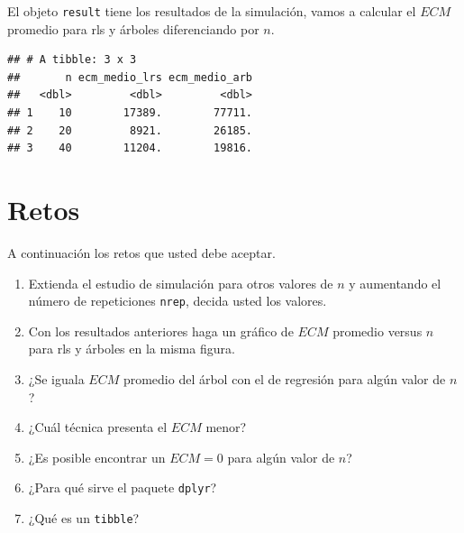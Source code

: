 \documentclass[]{book}
\makeatletter
\newenvironment{Shaded}{\begin{snugshade}}{\end{snugshade}}
\newcommand{\DataTypeTok}[1]{\textcolor[rgb]{0.13,0.29,0.53}{#1}}
\newcommand{\KeywordTok}[1]{\textcolor[rgb]{0.13,0.29,0.53}{\textbf{#1}}}
\newcommand{\NormalTok}[1]{#1}
\newcommand{\OperatorTok}[1]{\textcolor[rgb]{0.81,0.36,0.00}{\textbf{#1}}}
\newcommand{\StringTok}[1]{\textcolor[rgb]{0.31,0.60,0.02}{#1}}
\providecommand{\tightlist}{%
  \setlength{\itemsep}{0pt}\setlength{\parskip}{0pt}}
\newenvironment{kframe}{%
\medskip{}
\setlength{\fboxsep}{.8em}
 \def\at@end@of@kframe{}%
 \ifinner\ifhmode%
  \def\at@end@of@kframe{\end{minipage}}%
  \begin{minipage}{\columnwidth}%
 \fi\fi%
 \def\FrameCommand##1{\hskip\@totalleftmargin \hskip-\fboxsep
 \colorbox{shadecolor}{##1}\hskip-\fboxsep
     \hskip-\linewidth \hskip-\@totalleftmargin \hskip\columnwidth}%
 \MakeFramed {\advance\hsize-\width
   \@totalleftmargin\z@ \linewidth\hsize
   \@setminipage}}%
 {\par\unskip\endMakeFramed%
 \at@end@of@kframe}
\renewenvironment{Shaded}{\begin{kframe}}{\end{kframe}}
\makeatother
\begin{document}
El objeto \texttt{result} tiene los resultados de la simulación, vamos a calcular el \(ECM\) promedio para rls y árboles diferenciando por \(n\).

\begin{Shaded}
\end{Shaded}

\begin{verbatim}
## # A tibble: 3 x 3
##       n ecm_medio_lrs ecm_medio_arb
##   <dbl>         <dbl>         <dbl>
## 1    10        17389.        77711.
## 2    20         8921.        26185.
## 3    40        11204.        19816.
\end{verbatim}

\hypertarget{retos}{%
\section*{Retos}\label{retos}}

A continuación los retos que usted debe aceptar.

\begin{enumerate}
\def\labelenumi{\arabic{enumi}.}
\tightlist
\item
  Extienda el estudio de simulación para otros valores de \(n\) y aumentando el número de repeticiones \texttt{nrep}, decida usted los valores.
\item
  Con los resultados anteriores haga un gráfico de \(ECM\) promedio versus \(n\) para rls y árboles en la misma figura.
\item
  ¿Se iguala \(ECM\) promedio del árbol con el de regresión para algún valor de \(n\)?
\item
  ¿Cuál técnica presenta el \(ECM\) menor?
\item
  ¿Es posible encontrar un \(ECM=0\) para algún valor de \(n\)?
\item
  ¿Para qué sirve el paquete \texttt{dplyr}?
\item
  ¿Qué es un \texttt{tibble}?
\end{enumerate}



\backmatter
\printindex
\end{document}
